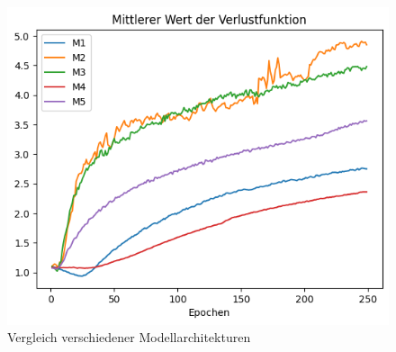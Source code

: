 \begin{figure}[H]
    \centering
    \includegraphics[width=.75\textwidth]{abbildungen/LossModelle.png}
    \caption{Vergleich verschiedener Modellarchitekturen}
    \label{fig:LossModelle}
\end{figure}